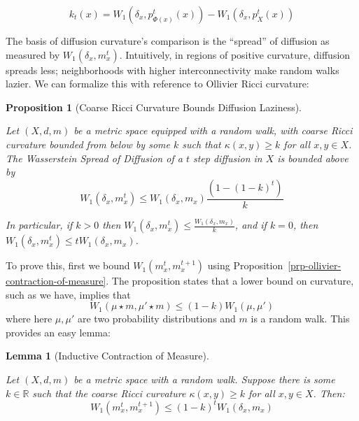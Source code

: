 \documentclass[
  letterpaper,
  DIV=11,
  numbers=noendperiod]{scrartcl}
\theoremstyle{plain}
\theoremstyle{plain}
\newtheorem{proposition}{Proposition}[section]
\theoremstyle{definition}
\theoremstyle{plain}
\newtheorem{lemma}{Lemma}[section]
\theoremstyle{definition}
\theoremstyle{remark}
\begin{document}
\[
k_t(x)=W_1\left(\delta_x, p_{\Phi(x)}^t(x)\right) - W_1\left(\delta_x, p_X^t(x)\right)
\]

The basis of diffusion curvature's comparison is the ``spread'' of
diffusion as measured by \(W_{1}(\delta_{x},m_{x}^t)\). Intuitively, in
regions of positive curvature, diffusion spreads less; neighborhoods
with higher interconnectivity make random walks lazier. We can formalize
this with reference to Ollivier Ricci curvature:

\begin{proposition}[Coarse Ricci Curvature Bounds Diffusion
Laziness]\protect\hypertarget{prp-coarse-ricci-curvature-bounds-diffusion-laziness}{}\label{prp-coarse-ricci-curvature-bounds-diffusion-laziness}

Let \((X,d,m)\) be a metric space equipped with a random walk, with
coarse Ricci curvature bounded from below by some \(k\) such that
\(\kappa(x,y) \geq k\) for all \(x,y \in X\). The Wasserstein Spread of
Diffusion of a \(t\) step diffusion in \(X\) is bounded above by \[
W_{1}(\delta_{x}, m_{x}^t) \leq W_1\left(\delta_x,m_x\right)\frac{(1-(1-k)^t)}{k}
\]

In particular, if \(k>0\) then
\(W_{1}(\delta_{x},m_{x}^t) \leq \frac{W_1\left(\delta_x,m_x\right)}{k}\),
and if \(k=0\), then
\(W_{1}(\delta_{x},m_{x}^t) \leq tW_1\left(\delta_x,m_x\right)\).

\end{proposition}

To prove this, first we bound \(W_{1}(m_{x}^t,m_{x}^{t+1})\) using
Proposition~\ref{prp-ollivier-contraction-of-measure}. The proposition
states that a lower bound on curvature, such as we have, implies that \[
W_{1}(\mu \star m, \mu' \star m) \leq (1-k)W_{1}(\mu, \mu')
\] where here \(\mu,\mu'\) are two probability distributions and \(m\)
is a random walk. This provides an easy lemma:

\begin{lemma}[Inductive Contraction of
Measure]\protect\hypertarget{lem-inductive-contraction-of-measure}{}\label{lem-inductive-contraction-of-measure}

Let \((X,d,m)\) be a metric space with a random walk. Suppose there is
some \(k \in \mathbb{R}\) such that the coarse Ricci curvature
\(\kappa(x,y) \geq k\) for all \(x,y \in X\). Then: \[
W_1\left(m_x^t, m_x^{t+1}\right) \leq(1-k)^t W_1\left(\delta_x,m_x\right)
\]

\end{lemma}
\end{document}
